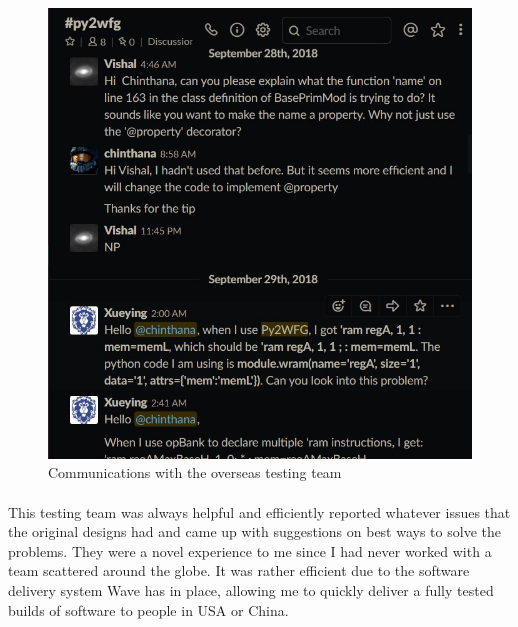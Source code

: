 \begin{figure}[H]
    \centering
    \includegraphics[trim=0cm 0cm 0cm 0cm, clip=true,scale=0.5]{figures/global_team.jpg}
    \caption{Communications with the overseas testing team\label{Fig:globalteam}}\vspace{-4mm}
    \end{figure}

\paragraph{}
This testing team was always helpful and efficiently reported whatever issues that the original designs had and came up with suggestions on best ways to solve the problems. They were a novel experience to me since I had never worked with a team scattered around the globe. It was rather efficient due to the software delivery system Wave has in place, allowing me to quickly deliver a fully tested builds of software to people in USA or China.
